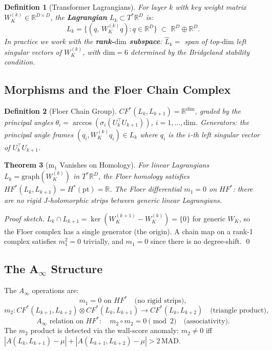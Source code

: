 \documentclass[11pt]{amsart}
\newtheorem{theorem}{Theorem}[section]
\newtheorem{definition}[theorem]{Definition}
\begin{document}
\begin{definition}[Transformer Lagrangians]
For layer $k$ with key weight matrix $W_K^{(k)} \in \mathbb{R}^{D\times D}$,
the \textbf{Lagrangian} $L_k \subset T^*\mathbb{R}^D$ is:
\[
  L_k = \bigl\{(q,\, W_K^{(k)} q) : q \in \mathbb{R}^D\bigr\}
  \;\subset\; \mathbb{R}^D \oplus \mathbb{R}^D.
\]
In practice we work with the \textbf{rank-$\mathrm{dim}$ subspace}:
$\hat{L}_k = $ span of top-$\mathrm{dim}$ left singular vectors of $W_K^{(k)}$,
with $\mathrm{dim}=6$ determined by the Bridgeland stability condition.
\end{definition}

\subsection{Morphisms and the Floer Chain Complex}

\begin{definition}[Floer Chain Group]
$CF^{*}(L_k, L_{k+1}) = \mathbb{R}^{\mathrm{dim}}$, graded by the
principal angles $\theta_i = \arccos(\sigma_i(U_k^\top U_{k+1}))$,
$i=1,\ldots,\mathrm{dim}$.
Generators: the principal angle frames $(q_i, W_K^{(k)}q_i) \in L_k$
where $q_i$ is the $i$-th left singular vector of $U_k^\top U_{k+1}$.
\end{definition}

\begin{theorem}[m$_1$ Vanishes on Homology]
\label{thm:m1zero}
For linear Lagrangians $L_k = \mathrm{graph}(W_K^{(k)})$ in $T^*\mathbb{R}^D$,
the Floer homology satisfies
$HF^{*}(L_k, L_{k+1}) = H^*(\mathrm{pt}) = \mathbb{R}$.
The Floer differential $m_1 = 0$ on $HF^{*}$:
there are no rigid $J$-holomorphic strips between generic linear Lagrangians.
\end{theorem}

\begin{proof}[Proof sketch]
$L_k \cap L_{k+1} = \ker(W_K^{(k+1)} - W_K^{(k)}) = \{0\}$ for generic
$W_K$, so the Floer complex has a single generator (the origin).
A chain map on a rank-1 complex satisfies $m_1^2=0$ trivially,
and $m_1=0$ since there is no degree-shift. \qed
\end{proof}

\subsection{The A$_\infty$ Structure}

The $A_\infty$ operations are:
\[
  m_1 = 0 \text{ on } HF^{*} \quad\text{(no rigid strips)},
\]
\[
  m_2: CF^{*}(L_{k+1},L_{k+2}) \otimes CF^{*}(L_k,L_{k+1}) \to CF^{*}(L_k,L_{k+2})
  \quad\text{(triangle product)},
\]
\[
  A_\infty \text{ relation on } HF^{*}:
  \quad m_2 \circ m_2 = 0 \pmod{2} \quad\text{(associativity)}.
\]
The $m_2$ product is detected via the wall-score anomaly:
$m_2 \neq 0$ iff $|A(L_k,L_{k+1})-\mu| + |A(L_{k+1},L_{k+2})-\mu| > 2\,\mathrm{MAD}$.
\end{document}
